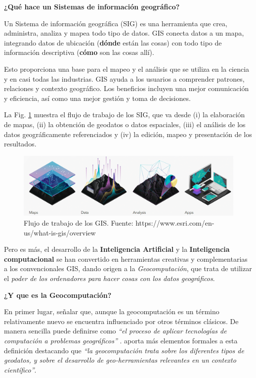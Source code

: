 \documentclass[
]{book}
\theoremstyle{definition}
\theoremstyle{definition}
\theoremstyle{definition}
\theoremstyle{definition}
\theoremstyle{remark}
\begin{document}
\textbf{¿Qué hace un Sistemas de información geográfico?}

Un Sistema de información geográfica (SIG) es una herramienta que crea,
administra, analiza y mapea todo tipo de datos. GIS conecta datos a un mapa,
integrando datos de ubicación (\textbf{dónde} están las cosas) con todo tipo de
información descriptiva (\textbf{cómo} son las cosas allí).

Esto proporciona una base para el mapeo y el análisis que se utiliza en la
ciencia y en casi todas las industrias. GIS ayuda a los usuarios a comprender
patrones, relaciones y contexto geográfico. Los beneficios incluyen una mejor
comunicación y eficiencia, así como una mejor gestión y toma de decisiones.

La Fig. \ref{fig:gisflujo} muestra el flujo de trabajo de los SIG, que va desde
(i) la elaboración de mapas, (ii) la obtención de geodatos o datos espaciales,
(iii) el análisis de los datos geográficamente referenciados y (iv) la edición,
mapeo y presentación de los resultados.

\begin{figure}

{\centering \includegraphics[width=0.7\linewidth]{img/GIS} 

}

\caption{Flujo de trabajo de los GIS. Fuente: https://www.esri.com/en-us/what-is-gis/overview}\label{fig:gisflujo}
\end{figure}

Pero es más, el desarrollo de la \textbf{Inteligencia Artificial} y la \textbf{Inteligencia
computacional} se han convertido en herramientas creativas y complementarias a
los convencionales GIS, dando origen a la \emph{Geocomputación}, que trata de
utilizar el \emph{poder de los ordenadores para hacer cosas con los datos
geográficos}.

\textbf{¿Y que es la Geocomputación?}

En primer lugar, señalar que, aunque la geocomputación es un término
relativamente nuevo se encuentra influenciado por otros términos clásicos. De
manera sencilla puede definirse como \emph{``el proceso de aplicar tecnologías de
computación a problemas geográficos''} \citep{rees1998}. \citet{Openshaw_Abrahart_2000}
aporta más elementos formales a esta definición destacando que \emph{``la
geocomputación trata sobre los diferentes tipos de geodatos, y sobre el
desarrollo de geo-herramientas relevantes en un contexto científico''}.
\end{document}
